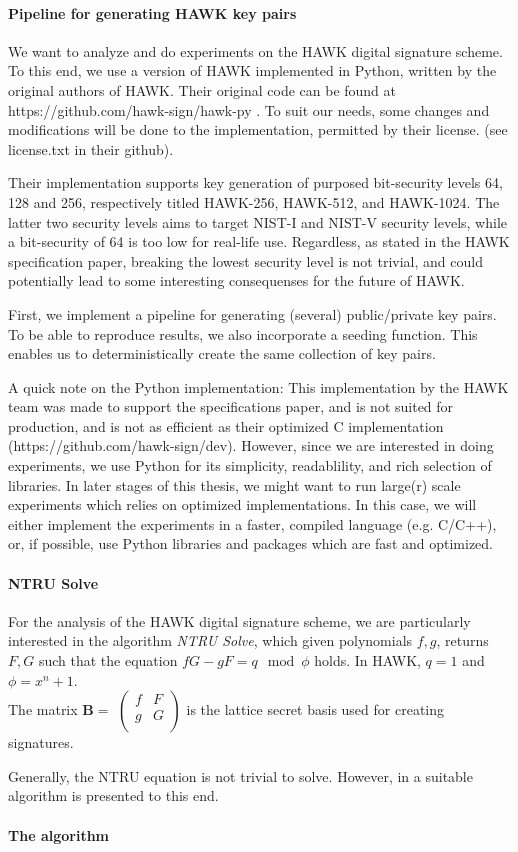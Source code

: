 \documentclass{article}
\begin{document}
\paragraph{Pipeline for generating HAWK key pairs}
We want to analyze and do experiments on the HAWK digital signature scheme. 
To this end, we use a version of HAWK implemented in Python, written by the original authors of HAWK.
Their original code can be found at https://github.com/hawk-sign/hawk-py . To suit our needs, some changes and modifications will
be done to the implementation, permitted by their license. (see license.txt in their github). \hfill \break

Their implementation supports key generation of purposed bit-security levels 64, 128 and 256,
respectively titled HAWK-256, HAWK-512, and HAWK-1024. The latter two security levels aims to target NIST-I and NIST-V security levels,
while a bit-security of 64 is too low for real-life use. Regardless, as stated in the HAWK specification paper, 
breaking the lowest security level is not trivial, and could potentially lead to some interesting consequenses for the future of HAWK. \hfill \break

First, we implement a pipeline for generating (several) public/private key pairs.
To be able to reproduce results, we also incorporate a seeding function. This enables us to deterministically create the same collection of key pairs. 

A quick note on the Python implementation: This implementation by the HAWK team was made to support the specifications paper, and is not suited 
for production, and is not as efficient as their optimized C implementation (https://github.com/hawk-sign/dev). 
However, since we are interested in doing experiments, we use Python for its simplicity, readablility, and rich selection of libraries.
In later stages of this thesis, we might want to run large(r) scale experiments which relies on optimized implementations.
In this case, we will either implement the experiments in a faster, compiled language (e.g. C/C++), or, if possible, use Python libraries and packages which are fast and optimized. 
\\

\paragraph{NTRU Solve}
For the analysis of the HAWK digital signature scheme, we are particularly interested in
the algorithm \textit{NTRU Solve}, which given polynomials $f, g$, returns $F, G$ such that
the equation $fG -gF = q \mod \phi$ holds. In HAWK, $q=1$ and $\phi = x^n + 1$. \\
The matrix $\mathbf{B} =$ 
$\begin{pmatrix}
f & F \\
g & G \\    
\end{pmatrix}$
is the lattice secret basis used for creating signatures. 

Generally, the NTRU equation is not trivial to solve. However, in 
\cite{PP} a suitable algorithm is presented to this end.
\paragraph{The algorithm}


\cite{HAWK-spec}


\end{document}

